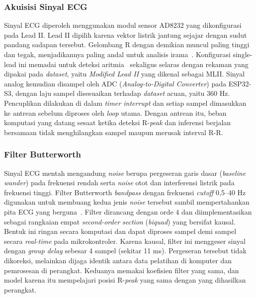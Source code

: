 \subsubsection{Akuisisi Sinyal ECG}

Sinyal ECG diperoleh menggunakan modul sensor AD8232 yang dikonfigurasi pada Lead II. Lead II dipilih karena vektor listrik jantung sejajar dengan sudut pandang sadapan tersebut. Gelombang R dengan demikian muncul paling tinggi dan tegak, menjadikannya paling andal untuk analisis irama~\cite{ecg_goldberger}. Konfigurasi single-lead ini memadai untuk deteksi aritmia~\cite{dias_2021} sekaligus selaras dengan rekaman yang dipakai pada \textit{dataset}, yaitu \textit{Modified Lead II} yang dikenal sebagai MLII. Sinyal analog kemudian disampel oleh ADC (\textit{Analog-to-Digital Converter}) pada ESP32-S3, dengan laju sampel disesuaikan terhadap \textit{dataset} acuan, yaitu 360 Hz. Pencuplikan dilakukan di dalam \textit{timer interrupt} dan setiap sampel dimasukkan ke antrean sebelum diproses oleh \textit{loop} utama. Dengan antrean itu, beban komputasi yang datang sesaat ketika deteksi R-\textit{peak} dan inferensi berjalan bersamaan tidak menghilangkan sampel maupun merusak interval R-R.

\subsubsection{Filter Butterworth}

Sinyal ECG mentah mengandung \textit{noise} berupa pergeseran garis dasar (\textit{baseline wander}) pada frekuensi rendah serta \textit{noise} otot dan interferensi listrik pada frekuensi tinggi. Filter Butterworth \textit{bandpass} dengan frekuensi \textit{cutoff} 0,5--40 Hz digunakan untuk membuang kedua jenis \textit{noise} tersebut sambil mempertahankan pita ECG yang berguna~\cite{zambrano_2026, bui_2021}. Filter dirancang dengan orde 4 dan diimplementasikan sebagai rangkaian empat \textit{second-order section} (\textit{biquad}) yang bersifat kausal. Bentuk ini ringan secara komputasi dan dapat diproses sampel demi sampel secara \textit{real-time} pada mikrokontroler.
Karena kausal, filter ini menggeser sinyal dengan \textit{group delay} sebesar 4 sampel (sekitar 11 ms). Pergeseran tersebut tidak dikoreksi, melainkan dijaga identik antara data pelatihan di komputer dan pemrosesan di perangkat. Keduanya memakai koefisien filter yang sama, dan model karena itu mempelajari posisi R-\textit{peak} yang sama dengan yang dihasilkan perangkat.

